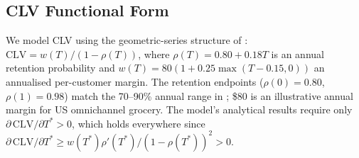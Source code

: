 \documentclass[msom,dblanonrev]{informs4}
\begin{document}
\subsection{CLV Functional Form}

We model CLV using the geometric-series structure of \citet{gupta2004valuing}: $\mathrm{CLV} = w(T) / (1 - \rho(T))$, where $\rho(T) = 0.80 + 0.18T$ is an annual retention probability and $w(T) = 80(1 + 0.25\max(T-0.15, 0))$ an annualised per-customer margin. The retention endpoints ($\rho(0) = 0.80$, $\rho(1) = 0.98$) match the 70--90\% annual range in \citet{gupta2004valuing}; \$80 is an illustrative annual margin for US omnichannel grocery. The model's analytical results require only $\partial\,\mathrm{CLV}/\partial T^* > 0$, which holds everywhere since $\partial\,\mathrm{CLV}/\partial T^* \geq w(T^*)\rho'(T^*)/(1-\rho(T^*))^2 > 0$.



\end{document}
